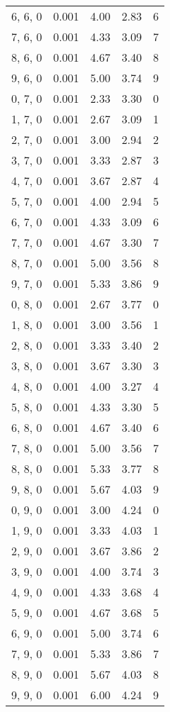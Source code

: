 \documentclass[12pt]{article}
\begin{document}
\begin{tabular}{c || c || c | c | c}
6, 6, 0 & 0.001 & 4.00 & 2.83 & 6 \\
7, 6, 0 & 0.001 & 4.33 & 3.09 & 7 \\
8, 6, 0 & 0.001 & 4.67 & 3.40 & 8 \\
9, 6, 0 & 0.001 & 5.00 & 3.74 & 9 \\
0, 7, 0 & 0.001 & 2.33 & 3.30 & 0 \\
1, 7, 0 & 0.001 & 2.67 & 3.09 & 1 \\
2, 7, 0 & 0.001 & 3.00 & 2.94 & 2 \\
3, 7, 0 & 0.001 & 3.33 & 2.87 & 3 \\
4, 7, 0 & 0.001 & 3.67 & 2.87 & 4 \\
5, 7, 0 & 0.001 & 4.00 & 2.94 & 5 \\
6, 7, 0 & 0.001 & 4.33 & 3.09 & 6 \\
7, 7, 0 & 0.001 & 4.67 & 3.30 & 7 \\
8, 7, 0 & 0.001 & 5.00 & 3.56 & 8 \\
9, 7, 0 & 0.001 & 5.33 & 3.86 & 9 \\
0, 8, 0 & 0.001 & 2.67 & 3.77 & 0 \\
1, 8, 0 & 0.001 & 3.00 & 3.56 & 1 \\
2, 8, 0 & 0.001 & 3.33 & 3.40 & 2 \\
3, 8, 0 & 0.001 & 3.67 & 3.30 & 3 \\
4, 8, 0 & 0.001 & 4.00 & 3.27 & 4 \\
5, 8, 0 & 0.001 & 4.33 & 3.30 & 5 \\
6, 8, 0 & 0.001 & 4.67 & 3.40 & 6 \\
7, 8, 0 & 0.001 & 5.00 & 3.56 & 7 \\
8, 8, 0 & 0.001 & 5.33 & 3.77 & 8 \\
9, 8, 0 & 0.001 & 5.67 & 4.03 & 9 \\
0, 9, 0 & 0.001 & 3.00 & 4.24 & 0 \\
1, 9, 0 & 0.001 & 3.33 & 4.03 & 1 \\
2, 9, 0 & 0.001 & 3.67 & 3.86 & 2 \\
3, 9, 0 & 0.001 & 4.00 & 3.74 & 3 \\
4, 9, 0 & 0.001 & 4.33 & 3.68 & 4 \\
5, 9, 0 & 0.001 & 4.67 & 3.68 & 5 \\
6, 9, 0 & 0.001 & 5.00 & 3.74 & 6 \\
7, 9, 0 & 0.001 & 5.33 & 3.86 & 7 \\
8, 9, 0 & 0.001 & 5.67 & 4.03 & 8 \\
9, 9, 0 & 0.001 & 6.00 & 4.24 & 9 \\

\end{tabular}
\end{document}
